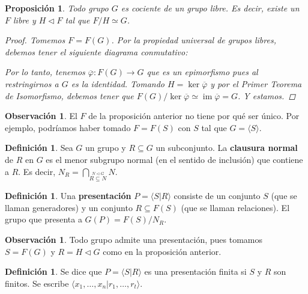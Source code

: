 \documentclass[12pt]{book}
\newtheorem{prop}[teo]{Proposición}
\theoremstyle{definition}
\newtheorem{obs}[teo]{Observación}
\newtheorem{defn}[teo]{Definición}
\DeclareMathOperator{\id}{id}
\DeclareMathOperator{\im}{im}
\begin{document}
\begin{prop}
Todo grupo $G$ es cociente de un grupo libre. Es decir, existe un $F$ libre y $H\triangleleft F$ tal que $F/H\simeq G$.
\begin{proof}
Tomemos $F=F(G)$. Por la propiedad universal de grupos libres, debemos tener el siguiente diagrama conmutativo: 

Por lo tanto, tenemos $\overline{\varphi}:F(G)\to G$ que es un epimorfismo pues al restringirnos a $G$ es la identidad. Tomando $H=\ker\overline{\varphi}$ y por el Primer Teorema de Isomorfismo, debemos tener que $F(G)/\ker\overline{\varphi}\simeq \im\overline{\varphi}=G$. Y estamos.
\end{proof}
\end{prop}
\begin{obs}
El $F$ de la proposición anterior no tiene por qué ser único. Por ejemplo, podríamos haber tomado $F=F(S)$ con $S$ tal que $G=\langle S\rangle$.
\end{obs}

\begin{defn}
Sea $G$ un grupo y $R\subseteq G$ un subconjunto. La \textbf{clausura normal} de $R$ en $G$ es el menor subgrupo normal (en el sentido de inclusión) que contiene a $R$. Es decir, $N_R = \displaystyle\bigcap_{\stackrel{N\triangleleft G}{R\subseteq N}} N$.
\end{defn}

\begin{defn}
Una \textbf{presentación} $P=\langle S | R\rangle$ consiste de un conjunto $S$ (que se llaman generadores) y un conjunto $R\subseteq F(S)$ (que se llaman relaciones). El grupo que presenta a $G(P) = F(S)/N_R$. 
\end{defn}

\begin{obs}
Todo grupo admite una presentación, pues tomamos $S=F(G)$ y $R= H\triangleleft G$ como en la proposición anterior.
\end{obs}

\begin{defn}
Se dice que $P=\langle S |R\rangle $ es una presentación finita si $S$ y $R$ son finitos. Se escribe $\langle x_1,\ldots , x_n | r_1,\ldots , r_t\rangle$.
\end{defn}
\end{document}
